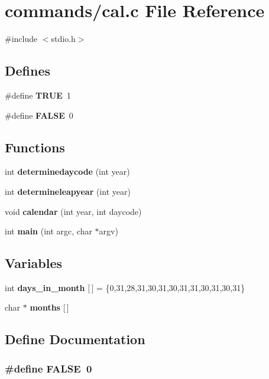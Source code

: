 \section{commands/cal.c File Reference}
\label{cal_8c}
{\ttfamily \#include $<$stdio.h$>$}\par
\subsection*{Defines}
\begin{DoxyCompactItemize}
\item 
\#define {\bf TRUE}~1
\item 
\#define {\bf FALSE}~0
\end{DoxyCompactItemize}
\subsection*{Functions}
\begin{DoxyCompactItemize}
\item 
int {\bf determinedaycode} (int year)
\item 
int {\bf determineleapyear} (int year)
\item 
void {\bf calendar} (int year, int daycode)
\item 
int {\bf main} (int argc, char $\ast$argv)
\end{DoxyCompactItemize}
\subsection*{Variables}
\begin{DoxyCompactItemize}
\item 
int {\bf days\_\-in\_\-month} [$\,$] = \{0,31,28,31,30,31,30,31,31,30,31,30,31\}
\item 
char $\ast$ {\bf months} [$\,$]
\end{DoxyCompactItemize}


\subsection{Define Documentation}
\subsubsection[{FALSE}]{\setlength{\rightskip}{0pt plus 5cm}\#define FALSE~0}\label{cal_8c_aa93f0eb578d23995850d61f7d61c55c1}



